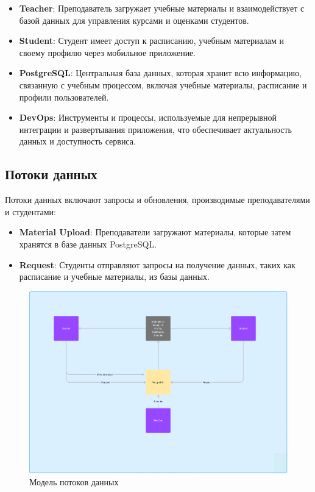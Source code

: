 \documentclass[a4paper,12pt]{article}
\begin{document}
\begin{itemize}
    \item \textbf{Teacher}: Преподаватель загружает учебные материалы и взаимодействует с базой данных для управления курсами и оценками студентов.
    \item \textbf{Student}: Студент имеет доступ к расписанию, учебным материалам и своему профилю через мобильное приложение.
    \item \textbf{PostgreSQL}: Центральная база данных, которая хранит всю информацию, связанную с учебным процессом, включая учебные материалы, расписание и профили пользователей.
    \item \textbf{DevOps}: Инструменты и процессы, используемые для непрерывной интеграции и развертывания приложения, что обеспечивает актуальность данных и доступность сервиса.
\end{itemize}

\subsection{Потоки данных}
Потоки данных включают запросы и обновления, производимые преподавателями и студентами:

\begin{itemize}
    \item \textbf{Material Upload}: Преподаватели загружают материалы, которые затем хранятся в базе данных PostgreSQL.
    \item \textbf{Request}: Студенты отправляют запросы на получение данных, таких как расписание и учебные материалы, из базы данных.
\end{itemize}

\begin{figure}
    \centering
    \includegraphics[width=1\linewidth]{Arch_program_compl.png}
    \caption{Модель потоков данных}
\end{figure}
\end{document}

